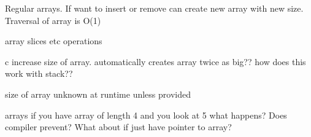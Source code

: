 Regular arrays. If want to insert or remove can create new array with new size.
Traversal of array is O(1)

array slices etc operations

c increase size of array. automatically creates array twice as big?? how does this work with stack??

size of array unknown at runtime unless provided


arrays if you have array of length 4 and you look at 5 what happens? Does compiler prevent? What about if just have pointer to array?


